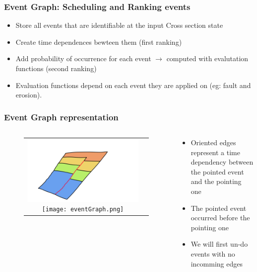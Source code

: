 \documentclass{beamer}
\begin{document}
	\begin{frame}
	\frametitle{Event Graph: Scheduling and Ranking events}
	\begin{itemize}
	\item Store all events that are identifiable at the input Cross section state
	\item Create time dependences bewteen them (first ranking)
	\item Add probability of occurrence for each event $\longrightarrow$ computed with evalutation functions (second ranking)
	\item Evaluation functions depend on each event they are applied on (eg: fault and erosion).
	\end{itemize}
	\end{frame}
	
	\begin{frame}
	\frametitle{Event Graph representation}
	\begin{columns}
	\begin{column}{0.55\textwidth}
	\begin{figure}[H]
	\centering
	\begin{tabular}{@{}cc@{}}
	\vspace*{2cm}
	\includegraphics[width=.73\textwidth]{unFaultSedDescription.png}
	\texttt{[image: eventGraph.png]}\\
	\end{tabular}
	\end{figure}
	\end{column}
	\begin{column}{0.55\textwidth}
	\begin{itemize}
	\item Oriented edges represent a time dependency between the pointed event and the pointing one
	\item The pointed event occurred before the pointing one
	\item We will first un-do events with no incomming edges
	\end{itemize}
	\end{column}
	\end{columns}
	\end{frame}
			
\end{document}
